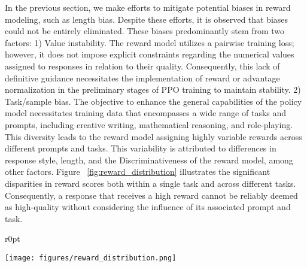  In the previous section, we make efforts to mitigate potential biases in reward modeling, such as length bias. Despite these efforts, it is observed that biases could not be entirely eliminated. These biases predominantly stem from two factors:
1) Value instability. The reward model utilizes a pairwise training loss; however, it does not impose explicit constraints regarding the numerical values assigned to responses in relation to their quality. Consequently, this lack of definitive guidance necessitates the implementation of reward or advantage normalization in the preliminary stages of PPO training to maintain stability.
2) Task/sample bias. The objective to enhance the general capabilities of the policy model necessitates training data that encompasses a wide range of tasks and prompts, including creative writing, mathematical reasoning, and role-playing. This diversity leads to the reward model assigning highly variable rewards across different prompts and tasks. This variability is attributed to differences in response style, length, and the Discriminativeness of the reward model, among other factors.
Figure ~\ref{fig:reward_distribution} illustrates the significant disparities in reward scores both within a single task and across different tasks. Consequently, a response that receives a high reward cannot be reliably deemed as high-quality without considering the influence of its associated prompt and task.

\begin{wrapfigure}{r}{0pt}
\centering
\begin{minipage}[t]{0.5\columnwidth}
\vspace{-3mm}
\texttt{[image: figures/reward\_distribution.png]}
\vspace{-6mm}
\caption{Reward distributions on different tasks.}
\label{fig:reward_distribution}
\vspace{-3mm}
\end{minipage}
\end{wrapfigure}

